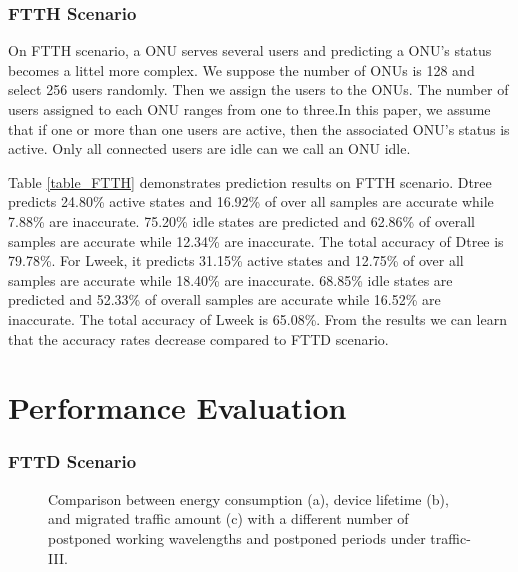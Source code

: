\documentclass[journal]{IEEEtran}
\begin{document}
\subsubsection{FTTH Scenario}
On FTTH scenario, a ONU serves several users and predicting a ONU's status becomes a littel more complex. We suppose the number of ONUs is 128 and select 256 users randomly. Then we assign the users to the ONUs. The number of users assigned to each ONU ranges from one to three.In this paper, we assume that if one or more than one users are active, then the associated ONU's status is active. Only all connected users are idle can we call an ONU idle. 

Table \ref{table_FTTH} demonstrates prediction results on FTTH scenario. Dtree predicts 24.80\% active states and 16.92\% of over all samples are accurate while 7.88\% are inaccurate. 75.20\% idle states are predicted and 62.86\% of overall samples are accurate while 12.34\% are inaccurate. The total accuracy of Dtree is 79.78\%. For Lweek, it predicts 31.15\% active states and 12.75\% of over all samples are accurate while 18.40\% are inaccurate. 68.85\% idle states are predicted and 52.33\% of overall samples are accurate while 16.52\% are inaccurate. The total accuracy of Lweek is 65.08\%. From the results we can learn that the accuracy rates decrease compared to FTTD scenario.

\section{Performance Evaluation}


\subsubsection{FTTD Scenario}
\begin{figure*}[h]
    \centering 
    \caption{Comparison between energy consumption (a), device lifetime (b), and migrated traffic amount (c) with a different number of postponed working wavelengths and postponed periods under traffic-III.} 
    \label{delay_energy} 
\end{figure*}
\end{document}
